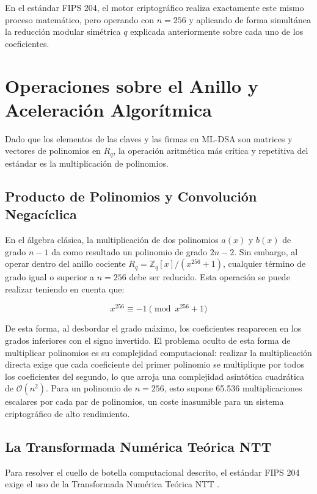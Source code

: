 \documentclass[11pt, a4paper]{report}
\theoremstyle{definition}
\begin{document}
En el estándar FIPS 204, el motor criptográfico realiza exactamente este mismo proceso matemático, pero operando con $n=256$ y aplicando de forma simultánea la reducción modular simétrica $q$ explicada anteriormente sobre cada uno de los coeficientes.

\section{Operaciones sobre el Anillo y Aceleración Algorítmica}

Dado que los elementos de las claves y las firmas en ML-DSA son matrices y vectores de polinomios en $R_q$, la operación aritmética más crítica y repetitiva del estándar es la multiplicación de polinomios. 

\subsection{Producto de Polinomios y Convolución Negacíclica}

En el álgebra clásica, la multiplicación de dos polinomios $a(x)$ y $b(x)$ de grado $n-1$ da como resultado un polinomio de grado $2n-2$. Sin embargo, al operar dentro del anillo cociente $R_q = \mathbb{Z}_q[x]/(x^{256} + 1)$, cualquier término de grado igual o superior a $n=256$ debe ser reducido. Esta operación se puede realizar teniendo en cuenta que:

$$x^{256} \equiv -1 \pmod{x^{256} + 1}$$

De esta forma, al desbordar el grado máximo, los coeficientes reaparecen en los grados inferiores con el signo invertido. El problema oculto de esta forma de multiplicar polinomios es su complejidad computacional: realizar la multiplicación directa exige que cada coeficiente del primer polinomio se multiplique por todos los coeficientes del segundo, lo que arroja una complejidad asintótica cuadrática de $\mathcal{O}(n^2)$. Para un polinomio de $n=256$, esto supone 65.536 multiplicaciones escalares por cada par de polinomios, un coste inasumible para un sistema criptográfico de alto rendimiento.

\subsection{La Transformada Numérica Teórica NTT}

Para resolver el cuello de botella computacional descrito, el estándar FIPS 204 exige el uso de la Transformada Numérica Teórica NTT \cite{ducas2018crystals}. 
\end{document}
